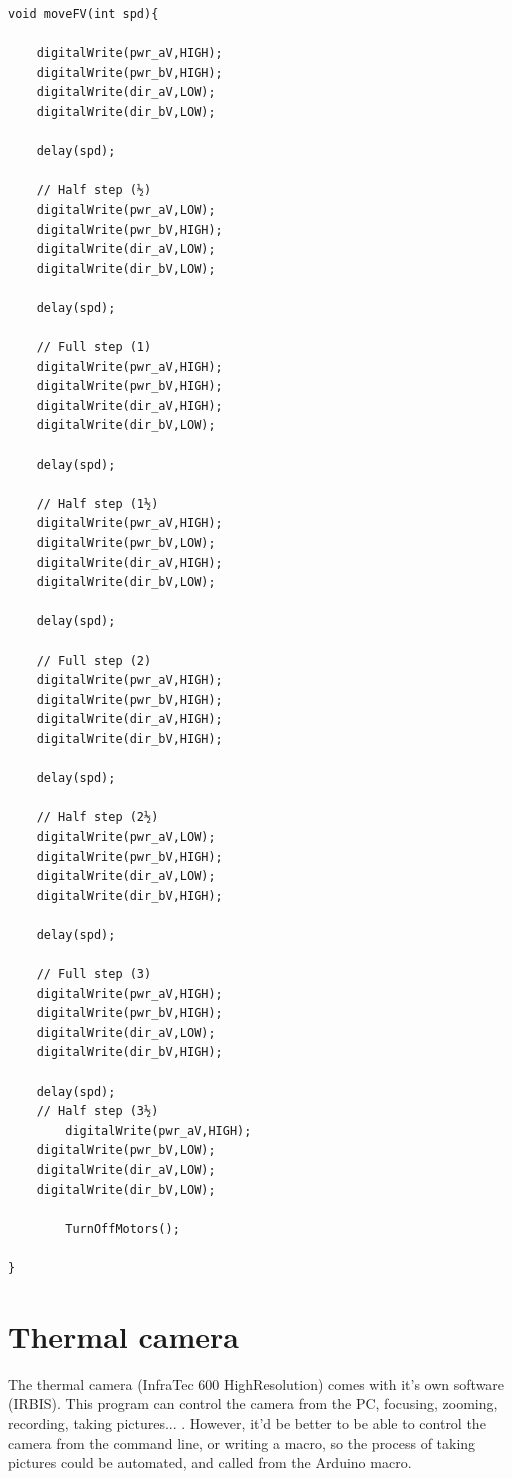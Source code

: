 \documentclass[a4paper,10pt]{article}
\begin{document}
\begin{lstlisting}
void moveFV(int spd){
  
  	digitalWrite(pwr_aV,HIGH);
	digitalWrite(pwr_bV,HIGH);
	digitalWrite(dir_aV,LOW);
	digitalWrite(dir_bV,LOW);
 
	delay(spd);
 
	// Half step (½)
	digitalWrite(pwr_aV,LOW);
	digitalWrite(pwr_bV,HIGH);
	digitalWrite(dir_aV,LOW);
	digitalWrite(dir_bV,LOW);
 
	delay(spd);
 
	// Full step (1)
	digitalWrite(pwr_aV,HIGH);
	digitalWrite(pwr_bV,HIGH);
	digitalWrite(dir_aV,HIGH);
	digitalWrite(dir_bV,LOW);
 
	delay(spd);
 
	// Half step (1½)
	digitalWrite(pwr_aV,HIGH);
	digitalWrite(pwr_bV,LOW);
	digitalWrite(dir_aV,HIGH);
	digitalWrite(dir_bV,LOW);

	delay(spd);

	// Full step (2)
	digitalWrite(pwr_aV,HIGH);
	digitalWrite(pwr_bV,HIGH);
	digitalWrite(dir_aV,HIGH);
	digitalWrite(dir_bV,HIGH);

	delay(spd);

	// Half step (2½)
	digitalWrite(pwr_aV,LOW);
	digitalWrite(pwr_bV,HIGH);
	digitalWrite(dir_aV,LOW);
	digitalWrite(dir_bV,HIGH);

	delay(spd);

	// Full step (3)
	digitalWrite(pwr_aV,HIGH);
	digitalWrite(pwr_bV,HIGH);
	digitalWrite(dir_aV,LOW);
	digitalWrite(dir_bV,HIGH);

	delay(spd);
	// Half step (3½)
        digitalWrite(pwr_aV,HIGH);
	digitalWrite(pwr_bV,LOW);
	digitalWrite(dir_aV,LOW);
	digitalWrite(dir_bV,LOW); 
  
        TurnOffMotors();
 
}
\end{lstlisting}


\section{Thermal camera}

The thermal camera (InfraTec 600 HighResolution) comes with it's own software (IRBIS). This program can control the camera from the PC, focusing, zooming, recording, taking pictures... .
However, it'd be better to be able to control the camera from the command line, or writing a macro, so the process of taking pictures could be automated, and called
from the Arduino macro.
\end{document}
